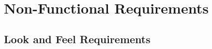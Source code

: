 \documentclass[]{article}
\begin{document}

\section{Non-Functional Requirements}
\label{sec:non-functional_requirements}



\subsection{Look and Feel Requirements}
\label{sub:look_and_feel_requirements}
\end{document}
